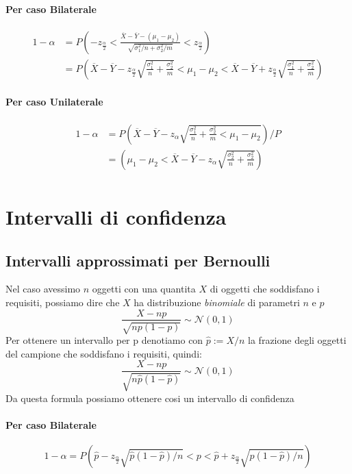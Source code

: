 \documentclass[]{article}
\begin{document}
    \paragraph{Per caso Bilaterale}
    $$
    \begin{aligned}
    1-\alpha & =P\left(-z_{\frac{\alpha}{2}}<\frac{\overline{X}-\overline{Y}-\left(\mu_1-\mu_2\right)}{\sqrt{\sigma_1^2 / n+\sigma_2^2 / m}}<z_{\frac{\alpha}{2}}\right) \\
    & =P\left(\overline{X}-\overline{Y}-z_{\frac{\alpha}{2}} \sqrt{\frac{\sigma_1^2}{n}+\frac{\sigma_2^2}{m}}<\mu_1-\mu_2<\overline{X}-\overline{Y}+z_{\frac{\alpha}{2}} \sqrt{\frac{\sigma_1^2}{n}+\frac{\sigma_2^2}{m}}\right)
    \end{aligned}
    $$
    \paragraph{Per caso Unilaterale}
    $$
    \begin{aligned}
    1 - \alpha &= P\left( \overline{X} - \overline{Y} - z_{\alpha} \sqrt{\frac{\sigma^2_1}{n} + \frac{\sigma^2_2}{m} < \mu_1 - \mu_2} \right) / P \\
    &= \left( \mu_1 - \mu_2 < \overline{X} - \overline{Y} - z_{\alpha} \sqrt{\frac{\sigma^2_2}{n} + \frac{\sigma^2_2}{m}} \right)\\
    \end{aligned}
    $$
    \section{Intervalli di confidenza}
    \subsection{Intervalli approssimati per Bernoulli}
    Nel caso avessimo $n$ oggetti con una quantita $X$ di oggetti che soddisfano i requisiti, possiamo dire che $X$ ha distribuzione \textit{binomiale} di parametri $n$ e $p$
    \[ \frac{X - np}{\sqrt{np(1-p)}} \sim \mathcal{N}(0,1) \]
    Per ottenere un intervallo per p denotiamo con $\hat{p} := X / n$ la frazione degli oggetti del campione che soddisfano i requisiti, quindi:
    \[ \frac{X - np}{\sqrt{n \hat{p}(1-\hat{p})}} \sim \mathcal{N}(0,1) \]
    Da questa formula possiamo ottenere cosi un intervallo di confidenza
    \paragraph{Per caso Bilaterale}
    \[ 1 - \alpha = P \left(\hat{p} - z_{\frac{\alpha}{2}} \sqrt{\hat{p} (1- \hat{p}) / n} < p < \hat{p} + z_{\frac{\alpha}{2}} \sqrt{\hat{p} (1- \hat{p}) / n} \right) \]
\end{document}
